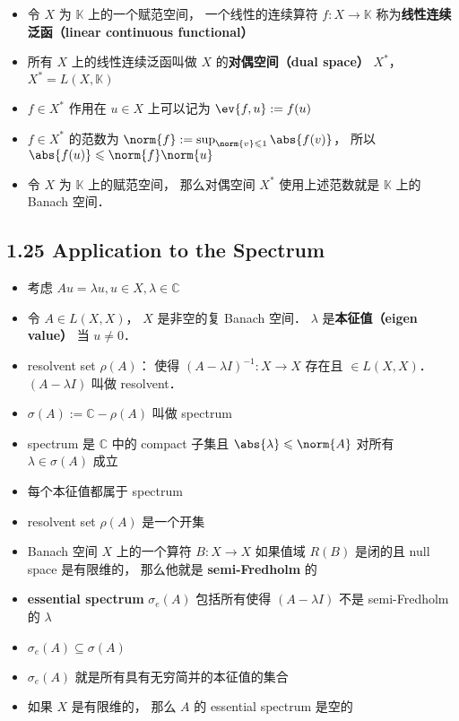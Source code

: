 \begin{itemize}
\item 令 $X$ 为 $\mathbb K$ 上的一个赋范空间， 一个线性的连续算符 $f: X \to \mathbb K$ 称为\textbf{线性连续泛函（linear continuous functional）}

\item 所有 $X$ 上的线性连续泛函叫做 $X$ 的\textbf{对偶空间（dual space）} $X^*$， $X^* = L(X, \mathbb K)$

\item $f \in X^*$ 作用在 $u \in X$ 上可以记为 $\ev{f, u} := f(u)$

\item $f\in X^*$ 的范数为 $\norm{f} := \sup_{\norm{v} \leqslant 1} \abs{f(v)}$， 所以 $\abs{f(u)} \leqslant \norm{f}\norm{u}$

\item 令 $X$ 为 $\mathbb K$ 上的赋范空间， 那么对偶空间 $X^*$ 使用上述范数就是 $\mathbb K$ 上的 Banach 空间．
\end{itemize}

\subsection{1.25 Application to the Spectrum}
\begin{itemize}
\item 考虑 $Au = \lambda u, u \in X, \lambda \in \mathbb C$

\item 令 $A\in L(X,X)$， $X$ 是非空的复 Banach 空间．  $\lambda$ 是\textbf{本征值（eigen value）} 当 $u\ne 0$．

\item resolvent set $\rho(A)$： 使得 $(A-\lambda I)^{-1}: X \to X$ 存在且 $\in L(X,X)$． $(A-\lambda I)$ 叫做 resolvent．

\item $\sigma(A) := \mathbb C - \rho(A)$ 叫做 spectrum

\item spectrum 是 $\mathbb C$ 中的 compact 子集且 $\abs{\lambda} \leqslant \norm{A}$ 对所有 $\lambda\in\sigma(A)$ 成立

\item 每个本征值都属于 spectrum

\item resolvent set $\rho(A)$ 是一个开集

\item Banach 空间 $X$ 上的一个算符 $B: X\to X$ 如果值域 $R(B)$ 是闭的且 null space 是有限维的， 那么他就是 \textbf{semi-Fredholm} 的

\item \textbf{essential spectrum} $\sigma_e(A)$ 包括所有使得 $(A - \lambda I)$ 不是 semi-Fredholm 的 $\lambda$
\item $\sigma_e(A) \subseteq \sigma(A)$
\item $\sigma_e(A)$ 就是所有具有无穷简并的本征值的集合
\item 如果 $X$ 是有限维的， 那么 $A$ 的 essential spectrum 是空的 
\end{itemize}
